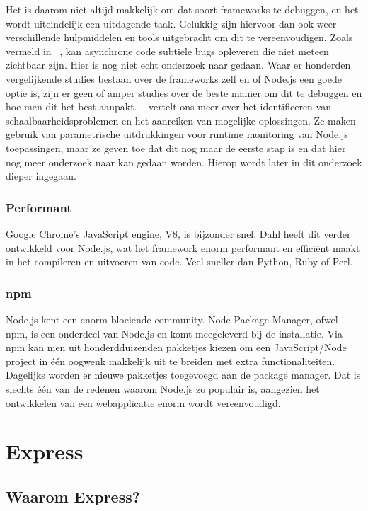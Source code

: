 Het is daarom niet altijd makkelijk om dat soort frameworks te debuggen, en het wordt uiteindelijk een uitdagende taak. Gelukkig zijn hiervoor dan ook weer verschillende hulpmiddelen en tools uitgebracht om dit te vereenvoudigen. Zoals vermeld in ~\autocite{Runtime2017}, kan asynchrone code subtiele bugs opleveren die niet meteen zichtbaar zijn. Hier is nog niet echt onderzoek naar gedaan. Waar er honderden vergelijkende studies bestaan over de frameworks zelf en of Node.js een goede optie is, zijn er geen of amper studies over de beste manier om dit te debuggen en hoe men dit het best aanpakt. ~\autocite{Runtime2017} vertelt ons meer over het identificeren van schaalbaarheidsproblemen en het aanreiken van mogelijke oplossingen. Ze maken gebruik van parametrische uitdrukkingen voor runtime monitoring van Node.js toepassingen, maar ze geven toe dat dit nog maar de eerste stap is en dat hier nog meer onderzoek naar kan gedaan worden. Hierop wordt later in dit onderzoek dieper ingegaan.

\subsubsection{Performant}
\label{sec:fast}

Google Chrome's JavaScript engine, V8, is bijzonder snel. Dahl heeft dit verder ontwikkeld voor Node.js, wat het framework enorm performant en efficiënt maakt in het compileren en uitvoeren van code. Veel sneller dan Python, Ruby of Perl.

\subsubsection{npm}
\label{sec:npm}

Node.js kent een enorm bloeiende community. Node Package Manager, ofwel npm, is een onderdeel van Node.js en komt meegeleverd bij de installatie. Via npm kan men uit honderdduizenden pakketjes kiezen om een JavaScript/Node project in één oogwenk makkelijk uit te breiden met extra functionaliteiten. Dagelijks worden er nieuwe pakketjes toegevoegd aan de package manager. Dat is slechts één van de redenen waarom Node.js zo populair is, aangezien het ontwikkelen van een webapplicatie enorm wordt vereenvoudigd.   

\section{Express}
\label{sec:express}

\subsection{Waarom Express?}
\label{sec:whyExpress}

